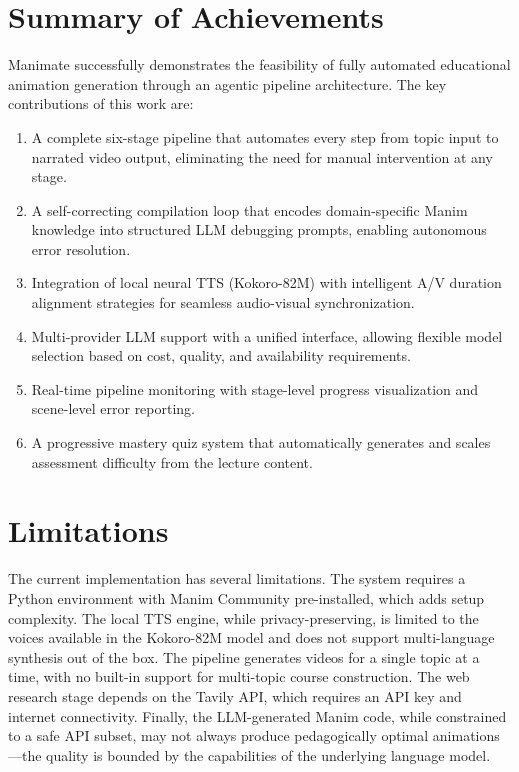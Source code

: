 \documentclass[12pt,a4paper,twoside,openright]{report}
\begin{document}
\section{Summary of Achievements}

Manimate successfully demonstrates the feasibility of fully automated educational animation generation through an agentic pipeline architecture. The key contributions of this work are:

\begin{enumerate}
  \item A complete six-stage pipeline that automates every step from topic input to narrated video output, eliminating the need for manual intervention at any stage.
  \item A self-correcting compilation loop that encodes domain-specific Manim knowledge into structured LLM debugging prompts, enabling autonomous error resolution.
  \item Integration of local neural TTS (Kokoro-82M) with intelligent A/V duration alignment strategies for seamless audio-visual synchronization.
  \item Multi-provider LLM support with a unified interface, allowing flexible model selection based on cost, quality, and availability requirements.
  \item Real-time pipeline monitoring with stage-level progress visualization and scene-level error reporting.
  \item A progressive mastery quiz system that automatically generates and scales assessment difficulty from the lecture content.
\end{enumerate}

\section{Limitations}

The current implementation has several limitations. The system requires a Python environment with Manim Community pre-installed, which adds setup complexity. The local TTS engine, while privacy-preserving, is limited to the voices available in the Kokoro-82M model and does not support multi-language synthesis out of the box. The pipeline generates videos for a single topic at a time, with no built-in support for multi-topic course construction. The web research stage depends on the Tavily API, which requires an API key and internet connectivity. Finally, the LLM-generated Manim code, while constrained to a safe API subset, may not always produce pedagogically optimal animations---the quality is bounded by the capabilities of the underlying language model.
\end{document}
